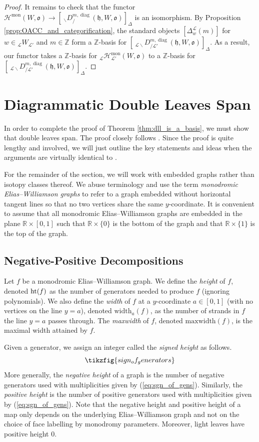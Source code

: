 \documentclass{amsart}
\newcommand{\Z}{\mathbb{Z}}
\newcommand{\R}{\mathbb{R}}
\newcommand{\scrH}{\mathcal{H}}
\newcommand{\scrL}{\mathcal{L}}
\newcommand{\fr}[1]{\mathfrak{#1}}
\DeclareMathOperator{\diag}{diag}
\DeclareMathOperator{\mon}{mon}
\newcommand{\DDBE}[2]{\:_{#1 \backslash} D_{/ #2}^{m, \diag}}
\newcommand{\W}[2]{{}_{#1}W_{#2}}
\theoremstyle{definition}
\numberwithin{equation}{subsection}
\begin{document}
\begin{proof}
    It remains to check that the functor $\scrH^{\mon} (W, \fr{o}) \to [\DDBE{}{} (\fr{h}, W, \fr{o}) ]_{\Delta}$ is an isomorphism. 
    By Proposition \ref{prop:OACC_and_categorification}, the standard objects $[\Delta_w^{\scrL} (m)]$ for $w \in \W{\scrL}{\scrL'}$ and $m \in \Z$ form a $\Z$-basis for $[\DDBE{\scrL}{\scrL'} (\fr{h}, W, \fr{o}) ]_{\Delta}$.
    As a result, our functor takes a $\Z$-basis for ${}_{\scrL} \scrH^{\mon}_{\scrL'} (W, \fr{o})$ to a $\Z$-basis for $[\DDBE{\scrL}{\scrL'} (\fr{h}, W, \fr{o}) ]_{\Delta}$. 
\end{proof}


    \section{Diagrammatic Double Leaves Span}\label{sec:spanning}

In order to complete the proof of Theorem \ref{thm:dll_is_a_basis}, we must show that double leaves span.
The proof closely follows \cite[\S 7]{EW}.
Since the proof is quite lengthy and involved, we will just outline the key statements and ideas when the arguments are virtually identical to \cite{EW}.

For the remainder of the section, we will work with embedded graphs rather than isotopy classes thereof.
We abuse terminology and use the term \emph{monodromic Elias--Williamson graphs} to refer to a graph embedded without horizontal tangent lines so that no two vertices share the same $y$-coordinate.
It is convenient to assume that all monodromic Elias--Williamson graphs are embedded in the plane $\R \times [0,1]$ such that $\R \times \{0\}$ is the bottom of the graph and that $\R \times \{1\}$ is the top of the graph.

\subsection{Negative-Positive Decompositions}

Let $f$ be a monodromic Elias--Williamson graph. We define the \emph{height} of $f$, denoted $\textnormal{ht} (f)$ as the number of generators needed to produce $f$ (ignoring polynomials).
We also define the \emph{width} of $f$ at a $y$-coordinate $a \in [0,1]$ (with no vertices on the line $y=a$), denoted $\text{width}_a (f)$, as the number of strands in $f$ the line $y=a$ passes through.
The \emph{maxwidth} of $f$, denoted $\text{maxwidth} (f)$, is the maximal width attained by $f$.

Given a generator, we assign an integer called the \emph{signed height} as follows.
\begin{equation}\label{eq:sgn_of_gens}
    \tikzfig{sign_of_generators}
\end{equation}
More generally, the \emph{negative height} of a graph is the number of negative generators used with multiplicities given by (\ref{eq:sgn_of_gens}).
Similarly, the \emph{positive height} is the number of positive generators used with multiplicities given by (\ref{eq:sgn_of_gens}).
Note that the negative height and positive height of a map only depends on the underlying Elias--Williamson graph and not on the choice of face labelling by monodromy parameters.
Moreover, light leaves have positive height 0.
\end{document}
